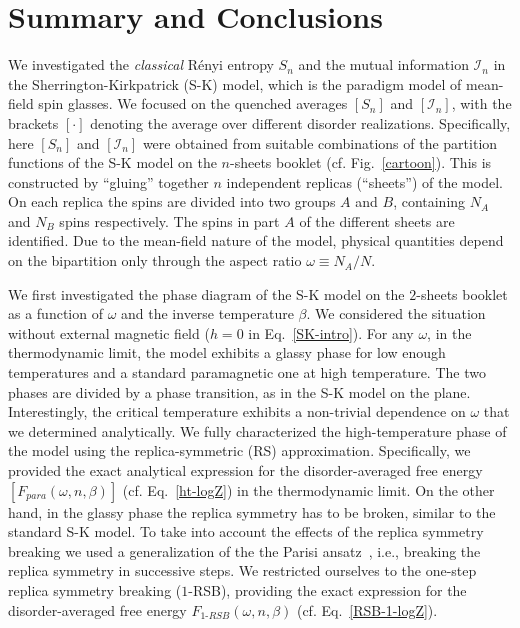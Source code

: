 \documentclass[twocolumn,superscriptaddress,prb,10pt]{revtex4-1}
\begin{document}
\section{Summary and Conclusions}
\label{conclusions}

We investigated the \emph{classical} R\'enyi entropy $S_n$ and the mutual information 
${\mathcal I}_n$ in the Sherrington-Kirkpatrick (S-K) model, which is the paradigm model 
of mean-field spin glasses. We focused on the quenched 
averages $[S_n]$ and $[{\mathcal I}_n]$, with the brackets $[\cdot]$ denoting the average 
over different disorder realizations. Specifically, here $[S_n]$ and $[{\mathcal I}_n]$ 
were obtained from suitable combinations of the partition functions of the S-K model on the 
$n$-sheets booklet (cf. Fig.~\ref{cartoon}). This is constructed by ``gluing'' together 
$n$ independent replicas (``sheets'') of the model. On each replica the spins are 
divided into two groups $A$ and $B$, containing $N_A$ and $N_B$ spins respectively. The 
spins in part $A$ of the different sheets are identified. Due to the mean-field nature of 
the model, physical quantities depend on the bipartition only through the aspect ratio 
$\omega\equiv N_A/N$. 

We first investigated the phase diagram of the S-K model on the $2$-sheets booklet as a 
function of $\omega$ and the inverse temperature $\beta$. We considered the situation 
without external magnetic field ($h=0$ in Eq.~\eqref{SK-intro}). For any $\omega$, in the 
thermodynamic limit, the model exhibits a glassy phase for low enough temperatures and 
a standard paramagnetic one at high temperature. The two phases are divided 
by a phase transition, as in the S-K model on the plane. Interestingly, the critical 
temperature exhibits a non-trivial dependence on $\omega$ that we determined analytically. 
We fully characterized the high-temperature phase of the model using the replica-symmetric 
(RS) approximation. Specifically, we provided the exact analytical expression for the 
disorder-averaged free energy $[F_{para}(\omega,n,\beta)]$  (cf. Eq.~\eqref{ht-logZ}) in 
the thermodynamic limit. On the other hand, in the glassy phase the replica symmetry has 
to be broken, similar to the standard S-K model. To take into account the effects of the 
replica symmetry breaking we used a generalization of the the Parisi 
ansatz~\cite{parisi-1980}, i.e., breaking the replica symmetry in successive 
steps. We restricted ourselves to the one-step replica symmetry breaking ($1$-RSB),   
providing the exact expression for the disorder-averaged free energy $F_{1\textrm{-}RSB}
(\omega,n,\beta)$ (cf. Eq.~\eqref{RSB-1-logZ}). 
\end{document}
